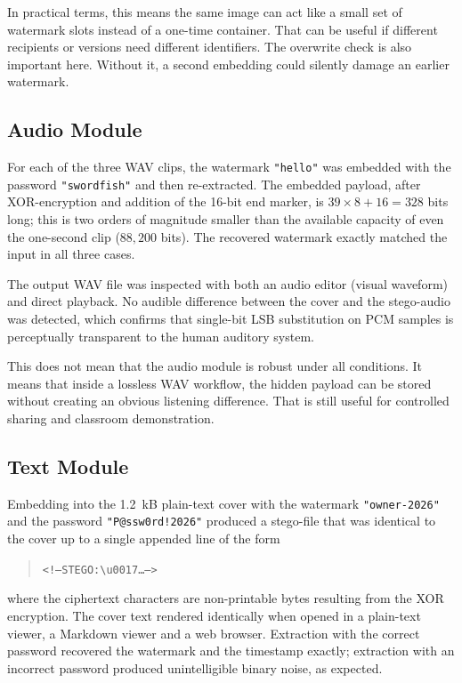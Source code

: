 In practical terms, this means the same image can act like a small set of watermark slots instead of a one-time container. That can be useful if different recipients or versions need different identifiers. The overwrite check is also important here. Without it, a second embedding could silently damage an earlier watermark.

\subsection{Audio Module}
\label{sec:audio_results}

For each of the three WAV clips, the watermark \texttt{"hello"} was embedded with the password \texttt{"swordfish"} and then re-extracted. The embedded payload, after XOR-encryption and addition of the 16-bit end marker, is $39 \times 8 + 16 = 328$ bits long; this is two orders of magnitude smaller than the available capacity of even the one-second clip ($88{,}200$ bits). The recovered watermark exactly matched the input in all three cases.

The output WAV file was inspected with both an audio editor (visual waveform) and direct playback. No audible difference between the cover and the stego-audio was detected, which confirms that single-bit LSB substitution on PCM samples is perceptually transparent to the human auditory system.

This does not mean that the audio module is robust under all conditions. It means that inside a lossless WAV workflow, the hidden payload can be stored without creating an obvious listening difference. That is still useful for controlled sharing and classroom demonstration.

\subsection{Text Module}
\label{sec:text_results}

Embedding into the 1.2~kB plain-text cover with the watermark \texttt{"owner-2026"} and the password \texttt{"P@ssw0rd!2026"} produced a stego-file that was identical to the cover up to a single appended line of the form
\begin{quote}
    \texttt{<!--STEGO:\textbackslash{}u0017\ldots-->}
\end{quote}
where the ciphertext characters are non-printable bytes resulting from the XOR encryption. The cover text rendered identically when opened in a plain-text viewer, a Markdown viewer and a web browser. Extraction with the correct password recovered the watermark and the timestamp exactly; extraction with an incorrect password produced unintelligible binary noise, as expected.

